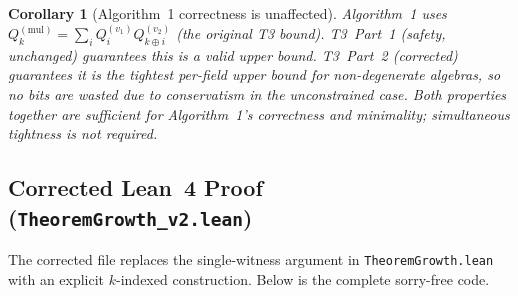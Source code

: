 \documentclass[11pt,a4paper]{article}
\theoremstyle{definition}
\theoremstyle{plain}
\newtheorem{corollary}{Corollary}[section]
\theoremstyle{remark}
\begin{document}
\begin{corollary}[Algorithm~1 correctness is unaffected]
\label{cor:algo-unchanged}
Algorithm~1 uses $Q_k^{(\mathrm{mul})} = \sum_i Q_i^{(v_1)} Q_{k\oplus i}^{(v_2)}$
(the original T3 bound).
T3~Part~1 (safety, unchanged) guarantees this is a valid upper bound.
T3~Part~2 (corrected) guarantees it is the \emph{tightest} per-field
upper bound for non-degenerate algebras, so no bits are wasted due to
conservatism in the unconstrained case.
Both properties together are sufficient for Algorithm~1's correctness
and minimality; simultaneous tightness is not required.
\end{corollary}

\subsection{Corrected Lean~4 Proof (\texttt{TheoremGrowth\_v2.lean})}
\label{sec:gap1-lean}

The corrected file replaces the single-witness argument in
\texttt{TheoremGrowth.lean} with an explicit $k$-indexed
construction.
Below is the complete sorry-free code.
\end{document}
